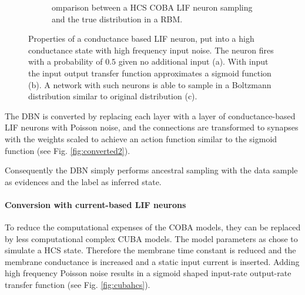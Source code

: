\begin{figure}
\begin{subfigure}[t]{.5\textwidth}
  		\caption{omparison between a HCS COBA LIF neuron sampling and the true distribution in a RBM.}
  		\label{fig:cobahcs3}
	\end{subfigure}
	\caption[Properties of a conductance based LIF neuron in a high conductance state.]{Properties of a conductance based LIF neuron, put into a high conductance state with high frequency input noise. The neuron fires with a probability of $0.5$ given no additional input (a). With input the input output transfer function approximates a sigmoid function (b). A network with such neurons is able to sample in a Boltzmann distribution similar to original distribution (c). }
	\label{fig:cobahcs}

\end{figure}
  
The DBN is converted by replacing each layer with a layer of conductance-based LIF neurons with Poisson noise, and the connections are transformed to synapses with the weights scaled to achieve an action function similar to the sigmoid function (see Fig. \ref{fig:converted2}).

Consequently the DBN simply performs ancestral sampling with the data sample as evidences and the label as inferred state.   


\paragraph{Conversion with current-based LIF neurons} \label{c:convascuba}

To reduce the computational expenses of the COBA models, they can be replaced by less computational complex CUBA models.
The model parameters as chose to simulate a HCS state.
Therefore the membrane time constant is reduced and the membrane conductance is increased and a static input current is inserted.  
Adding high frequency Poisson noise results in a sigmoid shaped input-rate output-rate transfer function (see Fig. \ref{fig:cubahcs}).

